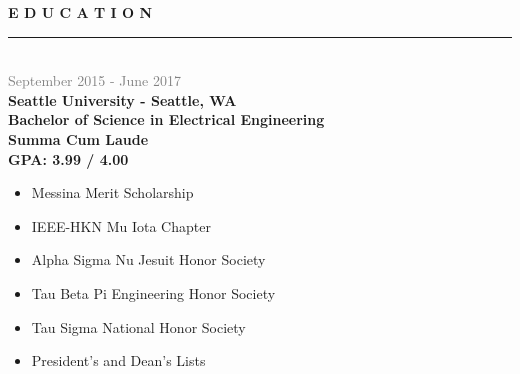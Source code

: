 \documentclass[letterpage]{article}
\begin{document}
\begin{minipage}[t]{0.424\linewidth}
\vspace{0pt}
\textbf{\fontsize{14px}{1px}\selectfont E D U C A T I O N}\\
\noindent\rule{2.45in}{0.1pt}
\vspace{7px}\\
\textcolor{gray}{September 2015 - June 2017}\\
\textbf{\textsf{Seattle University - Seattle, WA}}\\
\textbf{Bachelor of Science in Electrical Engineering}\\
\textbf{Summa Cum Laude}\\
\textbf{GPA: 3.99 / 4.00}
\begin{itemize}[leftmargin=*,labelindent=5mm,labelsep=7mm]
\renewcommand\labelitemi{\rule[1mm]{0.33mm}{0.33mm}}
\renewcommand\labelitemii{$\blacksquare$}
\item
  Messina Merit Scholarship

\item
  IEEE-HKN Mu Iota Chapter
  {}
\item
  Alpha Sigma Nu Jesuit Honor Society
  {}
\item
  Tau Beta Pi Engineering Honor Society
\item
  Tau Sigma National Honor Society
\item
  President's and Dean's Lists
  {}
\end{itemize}
\vspace{7px}


\end{minipage}
\end{document}
